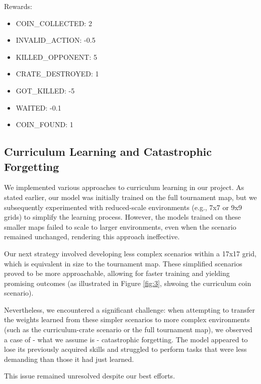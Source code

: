 \documentclass{article} %
\begin{document}
	Rewards:
	\begin{itemize}
		\item COIN\_COLLECTED: 2
		\item INVALID\_ACTION: -0.5
		\item KILLED\_OPPONENT: 5
		\item CRATE\_DESTROYED: 1
		\item GOT\_KILLED: -5
		\item WAITED: -0.1
		\item COIN\_FOUND: 1
	\end{itemize}
	
	
	\subsection{Curriculum Learning and Catastrophic Forgetting}
	We implemented various approaches to curriculum learning in our project. As stated earlier, our model was initially trained on the full tournament map, but we subsequently experimented with reduced-scale environments (e.g., 7x7 or 9x9 grids) to simplify the learning process. However, the models trained on these smaller maps failed to scale to larger environments, even when the scenario remained unchanged, rendering this approach ineffective.
	
	Our next strategy involved developing less complex scenarios within a 17x17 grid, which is equivalent in size to the tournament map. These simplified scenarios proved to be more approachable, allowing for faster training and yielding promising outcomes (as illustrated in Figure \ref{fig:3}, shwoing the curriculum coin scenario).
	
	Nevertheless, we encountered a significant challenge: when attempting to transfer the weights learned from these simpler scenarios to more complex environments (such as the curriculum-crate scenario or the full tournament map), we observed a case of - what we assume is - catastrophic forgetting. The model appeared to lose its previously acquired skills and struggled to perform tasks that were less demanding than those it had just learned.
	
	This issue remained unresolved despite our best efforts.
	
\end{document}
